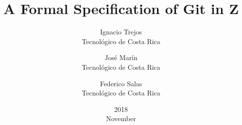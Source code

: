 \documentclass[titlepage]{article}
\title{A Formal Specification of Git in Z}
\date{2018\\ November}
\author{Ignacio Trejos\\ Tecnológico de Costa Rica
\and José Marín\\ Tecnológico de Costa Rica
\and Federico Salas\\ Tecnológico de Costa Rica}
\begin{document}
\maketitle

\tableofcontents
\listoffigures
\newpage



















\nocite{*}


\end{document}
